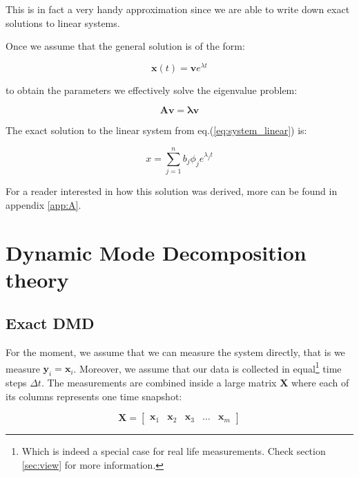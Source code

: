 \documentclass[10pt,twocolumn]{article}
\begin{document}
This is in fact a very handy approximation since we are able to write down exact solutions to linear systems.

Once we assume that the general solution is of the form:

\begin{equation} \label{eq:general_solution}
\mathbf{x}(t) = \mathbf{v} e^{\lambda t}
\end{equation}

to obtain the parameters we effectively solve the eigenvalue problem:

\begin{equation} \label{eq:eigenvalue_solution}
\mathbf{A} \mathbf{v} = \mathbf{\lambda} \mathbf{v}
\end{equation}

The exact solution to the linear system from eq.(\ref{eq:system_linear}) is:

\begin{equation} \label{eq:soln_exact}
x = \sum_{j = 1}^{n} b_j \phi_j e^{\lambda_j t}
\end{equation}

For a reader interested in how this solution was derived, more can be found in appendix \ref{app:A}. 

\section{Dynamic Mode Decomposition theory}\label{sec:theory}

\subsection{Exact DMD}

For the moment, we assume that we can measure the system directly, that is we measure $\mathbf{y}_i = \mathbf{x}_i$. Moreover, we assume that our data is collected in equal\footnote{Which is indeed a special case for real life measurements. Check section \ref{sec:view} for more information.} time steps $\Delta t$. The measurements are combined inside a large matrix $\mathbf{X}$ where each of its columns represents one time snapshot:

\begin{equation} \label{eq:X}
\mathbf{X} = 
\begin{bmatrix}
    \mathbf{x}_1 & \mathbf{x}_2 & \mathbf{x}_3 & \dots & \mathbf{x}_{m}
\end{bmatrix}
\end{equation}
\end{document}
